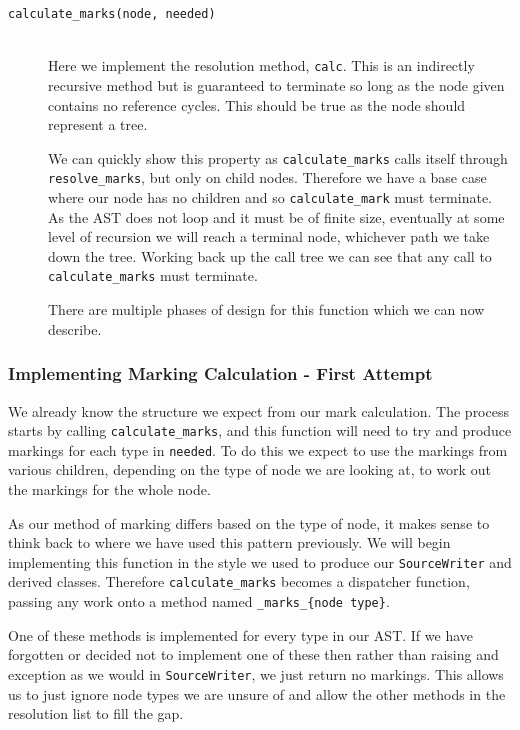 \documentclass[twoside,a4paper]{report}
\begin{document}
\begin{description}
\item[\texttt{calculate\_marks(node, needed)}] \hfill \\
Here we implement the resolution method, \texttt{calc}. This is an indirectly recursive method but is guaranteed to terminate so long as the node
given contains no reference cycles. This should be true as the node should represent a tree.

We can quickly show this property as \texttt{calculate\_marks} calls itself through \texttt{resolve\_marks}, but only on child nodes. Therefore we have
a base case where our node has no children and so \texttt{calculate\_mark} must terminate. As the AST does not loop and it must be of finite size,
eventually at some level of recursion we will reach a terminal node, whichever path we take down the tree. Working back up the call tree we can see
that any call to \texttt{calculate\_marks} must terminate.

There are multiple phases of design for this function which we can now describe.
\end{description}

\subsubsection{Implementing Marking Calculation - First Attempt}

We already know the structure we expect from our mark calculation. The process starts by calling \texttt{calculate\_marks}, and this function will
need to try and produce markings for each type in \texttt{needed}. To do this we expect to use the markings from various children, depending on the
type of node we are looking at, to work out the markings for the whole node.

As our method of marking differs based on the type of node, it makes sense to think back to where we have used this pattern previously. We will begin
implementing this function in the style we used to produce our \texttt{SourceWriter} and derived classes. Therefore \texttt{calculate\_marks} becomes
a dispatcher function, passing any work onto a method named \texttt{\_marks\_\{node type\}}.

One of these methods is implemented for every type in our AST. If we have forgotten or decided not to implement one of these then rather than raising
and exception as we would in \texttt{SourceWriter}, we just return no markings. This allows us to just ignore node types we are unsure of and allow
the other methods in the resolution list to fill the gap.
\end{document}
